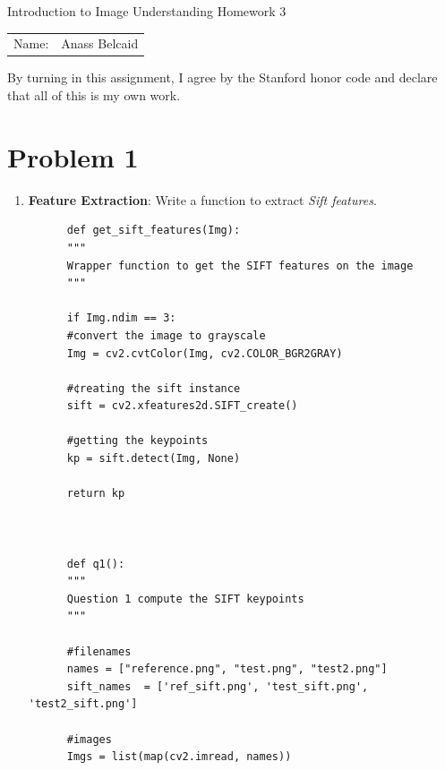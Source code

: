 \documentclass[12pt]{article}
\begin{document}
\begin{center}
{\Large Introduction to Image Understanding Homework 3}

\begin{tabular}{rl}
Name: &  Anass Belcaid \\
\end{tabular}
\end{center}

By turning in this assignment, I agree by the Stanford honor code and declare
that all of this is my own work.

\section*{Problem 1}

\begin{enumerate}[label=(\alph*)]
  \item \textbf{Feature Extraction}: Write a function to extract  \emph{Sift
      features}.

    \begin{verbatim}
      def get_sift_features(Img):
      """
      Wrapper function to get the SIFT features on the image
      """

      if Img.ndim == 3:
      #convert the image to grayscale
      Img = cv2.cvtColor(Img, cv2.COLOR_BGR2GRAY)

      #¢reating the sift instance
      sift = cv2.xfeatures2d.SIFT_create()

      #getting the keypoints
      kp = sift.detect(Img, None)

      return kp


      
      def q1():
      """
      Question 1 compute the SIFT keypoints
      """

      #filenames
      names = ["reference.png", "test.png", "test2.png"]
      sift_names  = ['ref_sift.png', 'test_sift.png', 'test2_sift.png']

      #images
      Imgs = list(map(cv2.imread, names))


\end{verbatim}
\end{enumerate}
\end{document}
